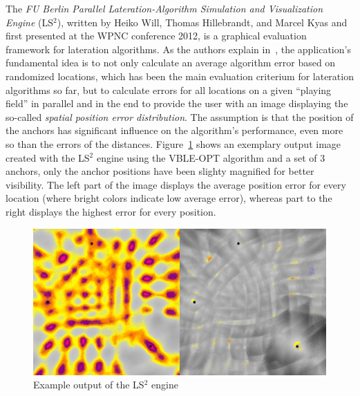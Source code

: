 The \emph{FU Berlin Parallel Lateration-Algorithm Simulation and Visualization Engine} (LS$^{2}$), written by Heiko Will, Thomas Hillebrandt, and Marcel Kyas and first presented at the WPNC conference 2012, is a graphical evaluation framework for lateration algorithms. As the authors explain in~\cite{will2012ls2}, the application's fundamental idea is to not only calculate an average algorithm error based on randomized locations, which has been the main evaluation criterium for lateration algorithms so far, but to calculate errors for all locations on a given ``playing field'' in parallel and in the end to provide the user with an image displaying the so-called \emph{spatial position error distribution}. The assumption is that the position of the anchors has significant influence on the algorithm's performance, even more so than the errors of the distances. Figure~\ref{fig:lateration} shows an exemplary output image created with the LS$^{2}$ engine using the VBLE-OPT algorithm and a set of 3 anchors, only the anchor positions have been slighty magnified for better visibility. The left part of the image displays the average position error for every location (where bright colors indicate low average error), whereas part to the right displays the highest error for every position.

\begin{figure}[ht]
\begin{center}
\includegraphics[width=14cm]{img/lateration}
\end{center}
\caption{Example output of the LS$^{2}$ engine}
\label{fig:lateration}
\end{figure}

